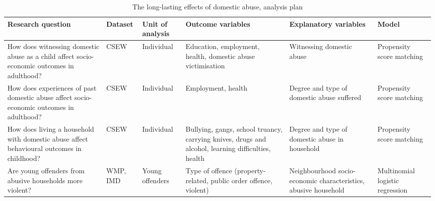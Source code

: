 \documentclass[11pt, a4paper]{article}
\begin{document}
\begin{table}[!htbp]
\caption{The long-lasting effects of domestic abuse, analysis plan}
  \begin{threeparttable}[t]
  \centering
       \begin{tabular}{ L{3.9cm}  C{1cm}  C{1.9cm}  C{3.2cm}  C{2.8cm}  C{1.6cm} }
    \toprule
     \textbf{Research question} & \textbf{Dataset}    & \textbf{Unit of analysis} & \textbf{Outcome variables} & \textbf{Explanatory variables} & \textbf{Model} \\
    \midrule
    How does witnessing domestic abuse as a child affect socio-economic outcomes in adulthood? & CSEW & Individual & Education, employment, health, domestic abuse victimisation & Witnessing domestic abuse & Propensity score matching \\
                \midrule
                   How does experiences of past domestic abuse affect socio-economic outcomes in adulthood? & CSEW & Individual & Employment, health & Degree and type of domestic abuse suffered & Propensity score matching \\
                \midrule
     How does living a household with domestic abuse affect behavioural outcomes in childhood? & CSEW & Individual & Bullying, gangs, school truancy, carrying knives, drugs and alcohol, learning difficulties, health & Degree and type of domestic abuse in household & Propensity score matching \\
                \midrule
          Are young offenders from abusive households more violent? & WMP, IMD & Young offenders & Type of offence (property-related, public order offence, violent) & Neighbourhood socio-economic characteristics, abusive household & Multinomial logistic regression \\
     \bottomrule
  \end{tabular}
    \end{threeparttable}%
  \label{tab:addlabel}%
\end{table}%

\end{document}
